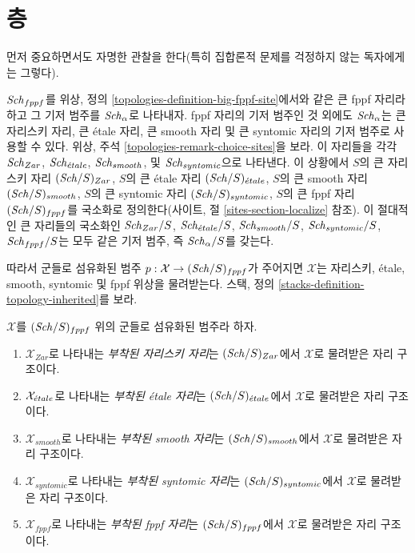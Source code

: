 \section{층}
\label{section-sheaves}

\noindent
먼저 중요하면서도 자명한 관찰을 한다(특히 집합론적 문제를 걱정하지
않는 독자에게는 그렇다).

\medskip\noindent
$\mathit{Sch}_{fppf}$를 위상, 정의 \ref{topologies-definition-big-fppf-site}에서와
같은 큰 fppf 자리라 하고 그 기저 범주를 $\mathit{Sch}_\alpha$로 나타내자.
fppf 자리의 기저 범주인 것 외에도 $\mathit{Sch}_\alpha$는 큰 자리스키 자리,
큰 \'etale 자리, 큰 smooth 자리 및 큰 syntomic 자리의 기저 범주로
사용할 수 있다. 위상, 주석 \ref{topologies-remark-choice-sites}을 보라.
이 자리들을 각각 $\mathit{Sch}_{Zar}$, $\mathit{Sch}_{\acute{e}tale}$, $\mathit{Sch}_{smooth}$,
및 $\mathit{Sch}_{syntomic}$으로 나타낸다.
이 상황에서 $S$의 큰 자리스키 자리 $(\mathit{Sch}/S)_{Zar}$, $S$의 큰 \'etale 자리
$(\mathit{Sch}/S)_{\acute{e}tale}$, $S$의 큰 smooth 자리 $(\mathit{Sch}/S)_{smooth}$, $S$의 큰 syntomic 자리
$(\mathit{Sch}/S)_{syntomic}$, $S$의 큰 fppf 자리 $(\mathit{Sch}/S)_{fppf}$를 국소화로
정의한다(사이트, 절 \ref{sites-section-localize} 참조). 이 절대적인
큰 자리들의 국소화인 $\mathit{Sch}_{Zar}/S$, $\mathit{Sch}_{\acute{e}tale}/S$,
$\mathit{Sch}_{smooth}/S$, $\mathit{Sch}_{syntomic}/S$, $\mathit{Sch}_{fppf}/S$는 모두 같은
기저 범주, 즉 $\mathit{Sch}_\alpha/S$를 갖는다.

\medskip\noindent
따라서 군들로 섬유화된 범주
$p : \mathcal{X} \to (\mathit{Sch}/S)_{fppf}$가 주어지면 $\mathcal{X}$는
자리스키, \'etale, smooth, syntomic 및 fppf 위상을 물려받는다. 스택,
정의 \ref{stacks-definition-topology-inherited}를 보라.

\begin{definition}
\label{definition-inherited-topologies}
$\mathcal{X}$를 $(\mathit{Sch}/S)_{fppf}$ 위의 군들로 섬유화된 범주라 하자.
\begin{enumerate}
\item $\mathcal{X}_{Zar}$로 나타내는 {\it 부착된 자리스키 자리}는
$(\mathit{Sch}/S)_{Zar}$에서 $\mathcal{X}$로 물려받은 자리 구조이다.
\item $\mathcal{X}_{\acute{e}tale}$로 나타내는 {\it 부착된 \'etale 자리}는
$(\mathit{Sch}/S)_{\acute{e}tale}$에서 $\mathcal{X}$로 물려받은 자리 구조이다.
\item $\mathcal{X}_{smooth}$로 나타내는 {\it 부착된 smooth 자리}는
$(\mathit{Sch}/S)_{smooth}$에서 $\mathcal{X}$로 물려받은 자리 구조이다.
\item $\mathcal{X}_{syntomic}$로 나타내는 {\it 부착된 syntomic 자리}는
$(\mathit{Sch}/S)_{syntomic}$에서 $\mathcal{X}$로 물려받은 자리 구조이다.
\item $\mathcal{X}_{fppf}$로 나타내는 {\it 부착된 fppf 자리}는
$(\mathit{Sch}/S)_{fppf}$에서 $\mathcal{X}$로 물려받은 자리 구조이다.
\end{enumerate}
\end{definition}

